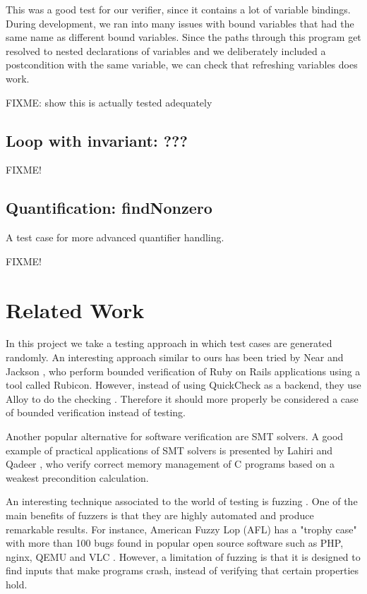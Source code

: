 \documentclass[a4paper]{article}
\begin{document}
This was a good test for our verifier, since it contains a lot of variable bindings. During development, we ran into many issues with bound variables that had the same name as different bound variables. Since the paths through this program get resolved to nested declarations of variables and we deliberately included a postcondition with the same variable, we can check that refreshing variables does work.

FIXME: show this is actually tested adequately

\subsection{Loop with invariant: ???}

FIXME!

\subsection{Quantification: findNonzero}

A test case for more advanced quantifier handling.

FIXME!

\section{Related Work}

In this project we take a testing approach in which test cases are generated
randomly. An interesting approach similar to ours has been tried by Near and Jackson
\cite{rubicon}, who perform bounded verification of Ruby on Rails applications
using a tool called Rubicon. However, instead of using QuickCheck as a backend,
they use Alloy to do the checking \cite{alloy}. Therefore it should more
properly be considered a case of bounded verification instead of testing.

Another popular alternative for software verification are SMT solvers.
A good example of practical applications of
SMT solvers is presented by Lahiri and Qadeer \cite{Lahiri}, who verify correct
memory management of C programs based on a weakest precondition calculation.

An interesting technique associated to the world of testing is fuzzing \cite{takanen2008fuzzing}.
One of the main benefits of fuzzers is that they are highly automated and
produce remarkable results. For instance, American Fuzzy Lop (AFL) has a "trophy case"
with more than 100 bugs found in popular open source software such as PHP, nginx, QEMU
and VLC \cite{afl}. However, a limitation of fuzzing is that it is designed to find
inputs that make programs crash, instead of verifying that certain properties hold.
\end{document}
